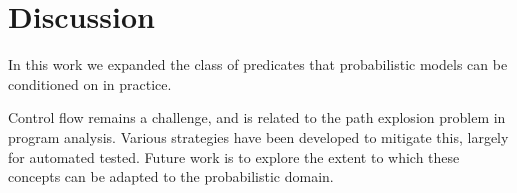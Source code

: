 \section{Discussion}
In this work we expanded the class of predicates that probabilistic models can be conditioned on in practice.

Control flow remains a challenge, and is related to the path explosion problem in program analysis.
Various strategies have been developed \cite{cadar2008exe, sen2005cute} to mitigate this, largely for automated tested.
Future work is to explore the extent to which these concepts can be adapted to the probabilistic domain.




